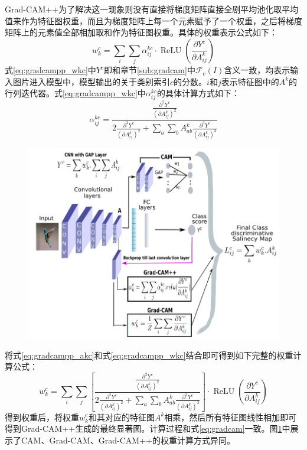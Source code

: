 Grad-CAM++为了解决这一现象则没有直接将梯度矩阵直接全剧平均池化取平均值来作为特征图权重，而且为梯度矩阵上每一个元素赋予了一个权重，之后将梯度矩阵上的元素值全部相加取和作为特征图权重。具体的权重表示公式如下：
\begin{equation}
	w_{k}^{c}=\sum_{i} \sum_{j} \alpha_{i j}^{k c} \cdot \operatorname{ReLU}\left(\frac{\partial Y^{c}}{\partial A_{i j}^{k}}\right)  
	\label{eq:gradcampp_wkc}
\end{equation}
式\ref{eq:gradcampp_wkc}中$Y^{c}$即和章节\ref{sub:gradcam}$中\mathcal{F}_c(I)$含义一致，均表示输入图片进入模型中，模型输出的关于类别索引$c$的分数。$i$和$j$表示特征图中的$A^{k}$的行列迭代器。式\ref{eq:gradcampp_wkc}中$\alpha_{i j}^{k c}$的具体计算方式如下：
\begin{equation}
	\alpha_{i j}^{k c}=\frac{\frac{\partial^{2} Y^{c}}{\left(\partial A_{ij}^{k}\right)^{2}}}{2 \frac{\partial^{2} Y^{c}}{\left(\partial A_{i j}^{k}\right)^{2}}+\sum_{a} \sum_{b} A_{a b}^{k}\frac{\partial^{3} Y^{c}}{\left(\partial A_{i j}^{k}\right)^{3}}}
	\label{eq:gradcampp_akc}
\end{equation}
\begin{figure}[h]
	\centering 
	\includegraphics[width=15cm]{fig/ch2/gradcampp2.png}
	\label{fig:gradcampp2}
\end{figure}
将式\ref{eq:gradcampp_akc}和式\ref{eq:gradcampp_wkc}结合即可得到如下完整的权重计算公式：
\begin{equation}
	w_{k}^{c}=\sum_{i} \sum_{j}\left[\frac{\frac{\partial^{2} Y^{c}}{\left(\partial A_{i j}^{k}\right)^{2}}}{2 \frac{\partial^{2} Y^{c}}{\left(\partial A_{i j}^{k}\right)^{2}}+\sum_{a} \sum_{b} A_{a b}^{k}\frac{\partial^{3} Y^{c}}{\left(\partial A_{i j}^{k}\right)^{3}}}\right] \cdot \operatorname{ReLU}\left(\frac{\partial Y^{c}}{\partial A_{i j}^{k}}\right)
\end{equation}
得到权重后，将权重$w_{k}^{c}$和其对应的特征图$A^k$相乘，然后所有特征图线性相加即可得到Grad-CAM++生成的最终显著图。计算过程和式\ref{eq:gradcam}一致。图\ref{fig:gradcampp2}中展示了CAM、Grad-CAM、Grad-CAM++的权重计算方式异同。


